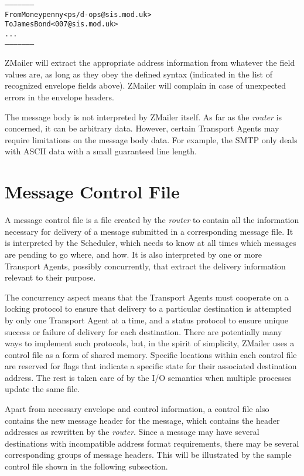 \begin{alltt}
     --------------------
     From Moneypenny <ps/d-ops@sis.mod.uk>
     To James Bond <007@sis.mod.uk>
     ...
     --------------------
\end{alltt}


ZMailer will extract the appropriate address information from whatever the
field values are, as long as they obey the defined syntax (indicated in the
list of recognized envelope fields above).  ZMailer will complain in case
of unexpected errors in the envelope headers.

The message body is not interpreted by ZMailer itself.  As far as the
{\em router} is concerned, it can be arbitrary data.  However, certain Transport
Agents may require limitations on the message body data. For example, the
SMTP only deals with ASCII data with a small guaranteed line length.










\section{Message Control File}

A message control file is a file created by the {\em router} to contain all the
information necessary for delivery of a message submitted in a
corresponding message file.  It is interpreted by the Scheduler, which
needs to know at all times which messages are pending to go where, and how.
It is also interpreted by one or more Transport Agents, possibly
concurrently, that extract the delivery information relevant to their
purpose.

The concurrency aspect means that the Transport Agents must cooperate on a
locking protocol to ensure that delivery to a particular destination is
attempted by only one Transport Agent at a time, and a status protocol to
ensure unique success or failure of delivery for each destination.  There
are potentially many ways to implement such protocols, but, in the spirit
of simplicity, ZMailer uses a control file as a form of shared memory.
Specific locations within each control file are reserved for flags that
indicate a specific state for their associated destination address.  The
rest is taken care of by the I/O semantics when multiple processes update
the same file.

Apart from necessary envelope and control information, a control file also
contains the new message header for the message, which contains the header
addresses as rewritten by the {\em router}.  Since a message may have several
destinations with incompatible address format requirements, there may be
several corresponding groups of message headers.  This will be illustrated
by the sample control file shown in the following subsection.





